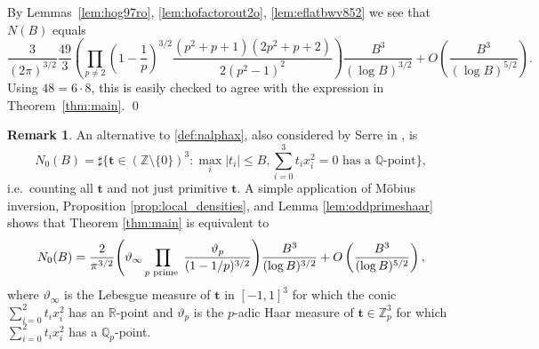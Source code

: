 \documentclass[a4paper,12pt,reqno]{amsart}
\numberwithin{equation}{section} \numberwithin{figure}{section}
\newcommand\Z{\mathbb{Z}}
\newcommand\Q{\mathbb{Q}}
\newcommand\RR{\mathbb{R}}
\renewcommand{\l}{\left}
\renewcommand{\r}{\right}
\renewcommand{\b}{\mathbf}
\renewcommand{\leq}{\leqslant}
\renewcommand{\#}{\sharp}
\theoremstyle{definition}
\newtheorem{remark}[lemma]{Remark}
\numberwithin{lemma}{section}
\begin{document}
By Lemmas~\ref{lem:hog97ro}, \ref{lem:hofactorout2o}, \ref{lem:eflatbwv852} we see that $N(B)$ equals   
 $$ 
  \frac{ 3   }{ (2\pi )^{ 3/2}} \frac{49}{3}  
\l(\prod_{p\neq 2 }  \l(1-\frac{1}{p} \r)^{3/2} 
\frac{(p^2+p+1)(2p^2+p+2)}{2(p^2-1)^2}
 \r)
\frac{B^3}{(\log B)^{3/2}} +O\l(\frac{B^3}{(\log B)^{5/2}}\r) .$$  
Using $48 = 6 \cdot 8$, this is easily checked to agree with the expression in Theorem~\ref{thm:main}.  \qed

\begin{remark} \label{rem:equiv}
	An alternative  to \eqref{def:nalphax}, also considered by Serre in \cite{Ser90},
	is 
	$$N_0(B) = \#\bigg\{\b t \in (\Z\setminus\{0\} )^3: 
	\max_i|t_i| \leq B,  \sum_{i=0}^3 t_i x_i^2=0 \textrm{ has a }\Q\textrm{-point}
	\bigg\},$$
	i.e.~counting all $\mathbf{t}$ and not just primitive $\mathbf{t}$. A simple
	application of M\"{o}bius inversion, Proposition \ref{prop:local_densities}, and 
	Lemma \ref{lem:oddprimeshaar} shows that Theorem \ref{thm:main} is equivalent to
	$$N_0(B)=\frac{2}{\pi^{3/2}   }\Bigg(
 \vartheta_\infty  
\prod_{\substack{ p \text{ \rm prime } } }
 \frac{   \vartheta_p}{      (1-1/p )^{3/2} }
\Bigg)
  \frac{B^3}{(\log B)^{3/2} }+O\left( \frac{B^3}{(\log B)^{5/2} } \right) ,$$
where
$  \vartheta_\infty $ is the Lebesgue measure of $\b t$ in $[-1,1]^3$ for which the conic $\sum_{i=0}^2t_ix_i^2$ has an $\RR$-point
and 
$ \vartheta_p$ is the  $p$-adic Haar measure of   
$\b t \in \Z_p^3$ for which $\sum_{i=0}^2t_ix_i^2$ 
 has a $\Q_p$-point. 
\end{remark}

 
\end{document}
